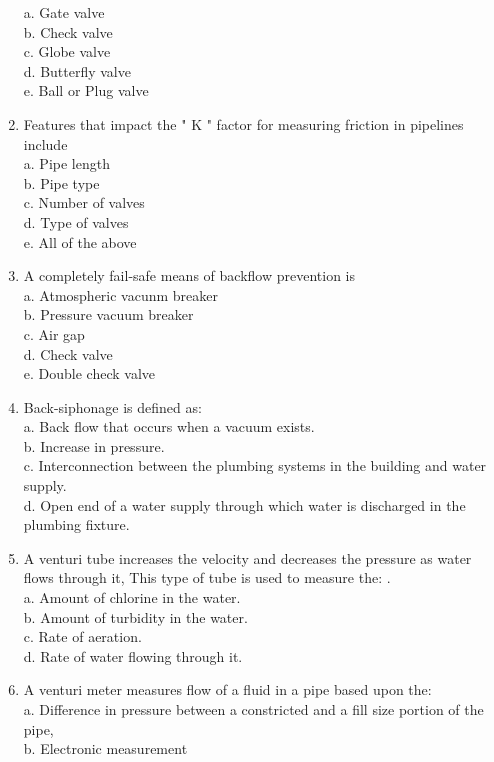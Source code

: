 \begin{enumerate}[1.]
a. Gate valve\\
b. Check valve\\
c. Globe valve\\
d. Butterfly valve\\
e. Ball or Plug valve\\
\item Features that impact the " $\mathrm{K}$ " factor for measuring friction in pipelines include\\
a. Pipe length\\
b. Pipe type\\
c. Number of valves\\
d. Type of valves\\
e. All of the above\\
\item A completely fail-safe means of backflow prevention is\\
a. Atmospheric vacunm breaker\\
b. Pressure vacuum breaker\\
c. Air gap\\
d. Check valve\\
e. Double check valve\\
\item Back-siphonage is defined as:\\
a. Back flow that occurs when a vacuum exists.\\
b. Increase in pressure.\\
c. Interconnection between the plumbing systems in the building and water supply.\\
d. Open end of a water supply through which water is discharged in the plumbing fixture.\\
\item A venturi tube increases the velocity and decreases the pressure as water flows through it, This type of tube is used to measure the: .\\
a. Amount of chlorine in the water.\\
b. Amount of turbidity in the water.\\
c. Rate of aeration.\\
d. Rate of water flowing through it.\\
\item A venturi meter measures flow of a fluid in a pipe based upon the:\\
a. Difference in pressure between a constricted and a fill size portion of the pipe,\\
b. Electronic measurement\\

\end{enumerate}
